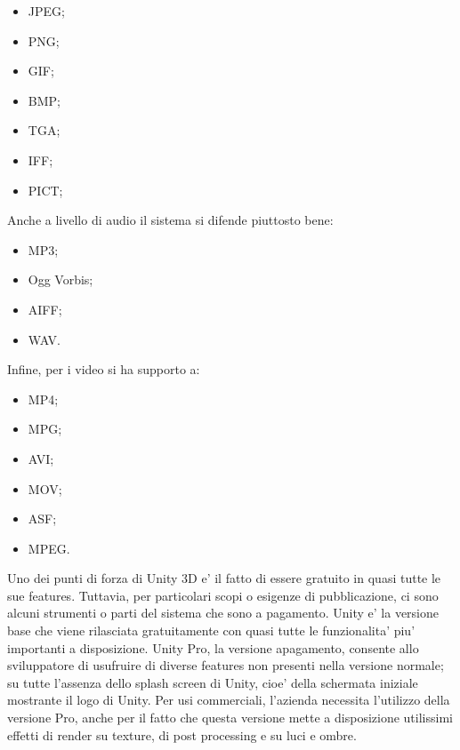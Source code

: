 \begin{multicols}{3}
	\begin{itemize}
	\item JPEG;
	\item PNG;
	\item GIF;
	\item BMP;
	\item TGA;
	\item IFF;
	\item PICT;
\end{itemize}
\end{multicols}

Anche a livello di audio il sistema si difende piuttosto bene: 
\begin{multicols}{2}
	\begin{itemize}
		\item MP3;
		\item Ogg Vorbis;
		\item AIFF;
		\item WAV.
	\end{itemize}
\end{multicols}

Infine, per i video si ha supporto a:
\begin{multicols}{3}
	\begin{itemize}
		\item MP4;
		\item MPG;
		\item AVI;
		\item MOV;
		\item ASF;
		\item MPEG.
	\end{itemize}
\end{multicols}

Uno dei punti di forza di Unity 3D e' il fatto di essere gratuito in quasi tutte le sue features. Tuttavia,
per particolari scopi o esigenze di pubblicazione, ci sono alcuni strumenti o parti del sistema che sono a pagamento. Unity e' la versione base che viene rilasciata gratuitamente con quasi tutte le funzionalita' piu' importanti a disposizione. Unity Pro, la versione apagamento, consente allo sviluppatore di usufruire di diverse features non presenti nella versione normale; su tutte l'assenza dello splash screen di Unity, cioe' della schermata iniziale mostrante il logo di Unity.
Per usi commerciali, l'azienda necessita l'utilizzo della versione Pro, anche per il fatto che questa versione mette a disposizione utilissimi effetti di render su texture, di post processing e su luci e ombre.
\\

